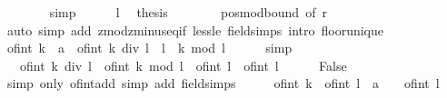 \begin{isabellebody}
\ \ \ \ \ \ \isamarkupfalse%
\ simp\isanewline
\ \ \ \ \isamarkupfalse%
\ l\ \isamarkupfalse%
\ {\isacharquery}{\kern0pt}thesis\isanewline
\ \ \ \ \ \ \isamarkupfalse%
\ pos{\isacharunderscore}{\kern0pt}mod{\isacharunderscore}{\kern0pt}bound\ {\isacharbrackleft}{\kern0pt}of\ r{\isacharbrackright}{\kern0pt}\isanewline
\ \ \ \ \ \ \isamarkupfalse%
\ {\isacharparenleft}{\kern0pt}auto\ simp\ add{\isacharcolon}{\kern0pt}\ zmod{\isacharunderscore}{\kern0pt}zminus{}{\isacharunderscore}{\kern0pt}eq{\isacharunderscore}{\kern0pt}if\ less{\isacharunderscore}{\kern0pt}le\ field{\isacharunderscore}{\kern0pt}simps\ intro{\isacharcolon}{\kern0pt}\ floor{\isacharunderscore}{\kern0pt}unique{\isacharparenright}{\kern0pt}\isanewline
\ \ \isamarkupfalse%
\isanewline
\ \ \isamarkupfalse%
\ {\isachardoublequoteopen}{\isacharparenleft}{\kern0pt}of{\isacharunderscore}{\kern0pt}int\ k\ {\isacharcolon}{\kern0pt}{\isacharcolon}{\kern0pt}\ {\isacharprime}{\kern0pt}a{\isacharparenright}{\kern0pt}\ {\isacharequal}{\kern0pt}\ of{\isacharunderscore}{\kern0pt}int\ {\isacharparenleft}{\kern0pt}k\ div\ l\ {\isacharasterisk}{\kern0pt}\ l\ {\isacharplus}{\kern0pt}\ k\ mod\ l{\isacharparenright}{\kern0pt}{\isachardoublequoteclose}\isanewline
\ \ \ \ \isamarkupfalse%
\ simp\isanewline
\ \ \isamarkupfalse%
\ \isamarkupfalse%
\ {\isachardoublequoteopen}{\isasymdots}\ {\isacharequal}{\kern0pt}\ {\isacharparenleft}{\kern0pt}of{\isacharunderscore}{\kern0pt}int\ {\isacharparenleft}{\kern0pt}k\ div\ l{\isacharparenright}{\kern0pt}\ {\isacharplus}{\kern0pt}\ of{\isacharunderscore}{\kern0pt}int\ {\isacharparenleft}{\kern0pt}k\ mod\ l{\isacharparenright}{\kern0pt}\ {\isacharslash}{\kern0pt}\ of{\isacharunderscore}{\kern0pt}int\ l{\isacharparenright}{\kern0pt}\ {\isacharasterisk}{\kern0pt}\ of{\isacharunderscore}{\kern0pt}int\ l{\isachardoublequoteclose}\isanewline
\ \ \ \ \isamarkupfalse%
\ False\ \isamarkupfalse%
\ {\isacharparenleft}{\kern0pt}simp\ only{\isacharcolon}{\kern0pt}\ of{\isacharunderscore}{\kern0pt}int{\isacharunderscore}{\kern0pt}add{\isacharparenright}{\kern0pt}\ {\isacharparenleft}{\kern0pt}simp\ add{\isacharcolon}{\kern0pt}\ field{\isacharunderscore}{\kern0pt}simps{\isacharparenright}{\kern0pt}\isanewline
\ \ \isamarkupfalse%
\ \isamarkupfalse%
\ {\isachardoublequoteopen}{\isacharparenleft}{\kern0pt}of{\isacharunderscore}{\kern0pt}int\ k\ {\isacharslash}{\kern0pt}\ of{\isacharunderscore}{\kern0pt}int\ l\ {\isacharcolon}{\kern0pt}{\isacharcolon}{\kern0pt}\ {\isacharprime}{\kern0pt}a{\isacharparenright}{\kern0pt}\ {\isacharequal}{\kern0pt}\ {\isasymdots}\ {\isacharslash}{\kern0pt}\ of{\isacharunderscore}{\kern0pt}int\ l{\isachardoublequoteclose}\isanewline

\end{isabellebody}
